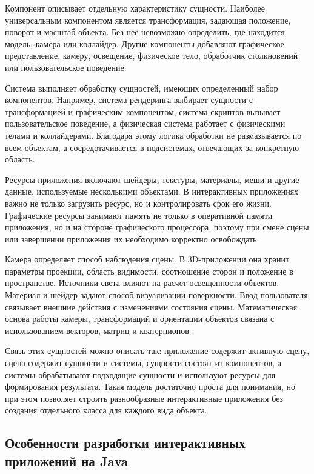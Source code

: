 Компонент описывает отдельную характеристику сущности. Наиболее
универсальным компонентом является трансформация, задающая положение,
поворот и масштаб объекта. Без нее невозможно определить, где находится
модель, камера или коллайдер. Другие компоненты добавляют графическое
представление, камеру, освещение, физическое тело, обработчик столкновений
или пользовательское поведение.

Система выполняет обработку сущностей, имеющих определенный набор
компонентов. Например, система рендеринга выбирает сущности с
трансформацией и графическим компонентом, система скриптов вызывает
пользовательское поведение, а физическая система работает с физическими
телами и коллайдерами. Благодаря этому логика обработки не размазывается
по всем объектам, а сосредотачивается в подсистемах, отвечающих за
конкретную область.

Ресурсы приложения включают шейдеры, текстуры, материалы, меши и другие
данные, используемые несколькими объектами. В интерактивных приложениях
важно не только загрузить ресурс, но и контролировать срок его жизни.
Графические ресурсы занимают память не только в оперативной памяти
приложения, но и на стороне графического процессора, поэтому при смене
сцены или завершении приложения их необходимо корректно освобождать.

Камера определяет способ наблюдения сцены. В 3D-приложении она хранит
параметры проекции, область видимости, соотношение сторон и положение в
пространстве. Источники света влияют на расчет освещенности объектов.
Материал и шейдер задают способ визуализации поверхности. Ввод
пользователя связывает внешние действия с изменениями состояния сцены.
Математическая основа работы камеры, трансформаций и ориентации объектов
связана с использованием векторов, матриц и кватернионов \cite{lengyel-math,dunn-parberry-math}.

Связь этих сущностей можно описать так: приложение содержит активную
сцену, сцена содержит сущности и системы, сущности состоят из компонентов,
а системы обрабатывают подходящие сущности и используют ресурсы для
формирования результата. Такая модель достаточно проста для понимания, но
при этом позволяет строить разнообразные интерактивные приложения без
создания отдельного класса для каждого вида объекта.

\subsection{Особенности разработки интерактивных приложений на Java}

